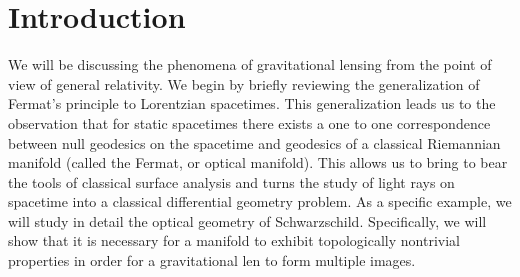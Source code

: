 
\section{Introduction}
We will be discussing the phenomena of gravitational lensing from the point of view of general relativity. We begin by briefly reviewing the generalization of Fermat's principle to Lorentzian spacetimes. This generalization leads us to the observation that for static spacetimes there exists a one to one correspondence between null geodesics on the spacetime and geodesics of a classical Riemannian manifold (called the Fermat, or optical manifold). This allows us to bring to bear the tools of classical surface analysis and turns the study of light rays on spacetime into a classical differential geometry problem. As a specific example, we will study in detail the optical geometry of Schwarzschild. Specifically, we will show that it is necessary for a manifold to exhibit topologically nontrivial properties in order for a gravitational len to form multiple images.


